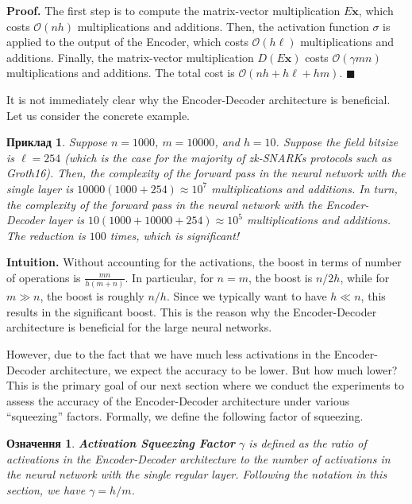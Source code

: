 \documentclass[12pt,a4paper,oneside]{book}
\theoremstyle{dplplain}
\theoremstyle{dpldefinition}
\newtheorem{definition}[theorem]{Означення}%
\theoremstyle{dplremark}
\newtheorem{example}[theorem]{Приклад}%
\begin{document}
\textbf{Proof.} The first step is to compute the matrix-vector multiplication
$E\mathbf{x}$, which costs $\mathcal{O}(nh)$ multiplications and additions.
Then, the activation function $\sigma$ is applied to the output of the Encoder,
which costs $\mathcal{O}(h\ell)$ multiplications and additions. Finally, the
matrix-vector multiplication $D(E\mathbf{x})$ costs $\mathcal{O}(\gamma mn)$
multiplications and additions. The total cost is $\mathcal{O}(nh+h\ell+hm)$.
$\blacksquare$

It is not immediately clear why the Encoder-Decoder architecture is beneficial.
Let us consider the concrete example.

\begin{example}
    Suppose $n=1000$, $m=10000$, and $h = 10$. Suppose the field bitsize is
    $\ell=254$ (which is the case for the majority of zk-SNARKs protocols such
    as Groth16). Then, the complexity of the forward pass in the neural network
    with the single layer is $10000(1000+254) \approx 10^7$ multiplications and
    additions. In turn, the complexity of the forward pass in the neural network
    with the Encoder-Decoder layer is $10(1000+10000+254) \approx 10^5$
    multiplications and additions. The reduction is $100$ times, which is
    significant!
\end{example}

\textbf{Intuition.} Without accounting for the activations, the boost in terms
of number of operations is $\frac{mn}{h(m+n)}$. In particular,
for $n=m$, the boost is $n/2h$, while for $m \gg n$, the boost is roughly $n/h$.
Since we typically want to have $h \ll n$, this results in the significant
boost. This is the reason why the Encoder-Decoder architecture is beneficial for
the large neural networks.

However, due to the fact that we have much less activations in the
Encoder-Decoder architecture, we expect the accuracy to be lower. But how much
lower? This is the primary goal of our next section where we conduct the
experiments to assess the accuracy of the Encoder-Decoder architecture under
various ``squeezing'' factors. Formally, we define the following factor of 
squeezing.

\begin{definition}
    \textbf{Activation Squeezing Factor} $\gamma$ is defined as the ratio of
    activations in the Encoder-Decoder architecture to the number of activations
    in the neural network with the single regular layer. Following the notation
    in this section, we have $\gamma = h/m$.
\end{definition}
\end{document}
